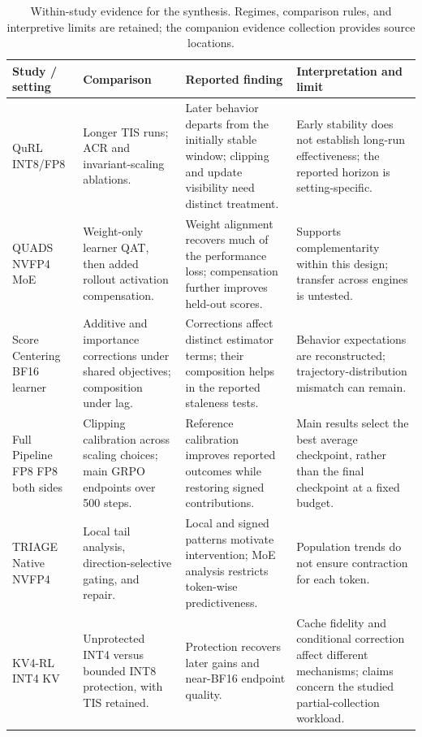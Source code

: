 \begin{table}[!htb]
\centering\small\setlength{\tabcolsep}{4pt}\renewcommand{\arraystretch}{1.12}
\caption{Within-study evidence for the synthesis. Regimes, comparison rules, and interpretive limits are retained; the companion evidence collection provides source locations.}\label{tab:observations}
\begin{tabularx}{\linewidth}{@{}P{27mm}YYY@{}}\toprule
{} \textbf{Study / setting} & \textbf{Comparison} & \textbf{Reported finding} & \textbf{Interpretation and limit}\\\midrule
{} QuRL \citep{qurl}\newline INT8/FP8 & Longer TIS runs; ACR and invariant-scaling ablations. & Later behavior departs from the initially stable window; clipping and update visibility need distinct treatment. & Early stability does not establish long-run effectiveness; the reported horizon is setting-specific.\\[6pt]
QUADS \citep{quads}\newline NVFP4 MoE & Weight-only learner QAT, then added rollout activation compensation. & Weight alignment recovers much of the performance loss; compensation further improves held-out scores. & Supports complementarity within this design; transfer across engines is untested.\\[6pt]
 Score Centering \citep{score}\newline BF16 learner & Additive and importance corrections under shared objectives; composition under lag. & Corrections affect distinct estimator terms; their composition helps in the reported staleness tests. & Behavior expectations are reconstructed; trajectory-distribution mismatch can remain.\\[6pt]
Full Pipeline FP8 \citep{fullfp8}\newline FP8 both sides & Clipping calibration across scaling choices; main GRPO endpoints over 500 steps. & Reference calibration improves reported outcomes while restoring signed contributions. & Main results select the best average checkpoint, rather than the final checkpoint at a fixed budget.\\[6pt]
 TRIAGE \citep{triage}\newline Native NVFP4 & Local tail analysis, direction-selective gating, and repair. & Local and signed patterns motivate intervention; MoE analysis restricts token-wise predictiveness. & Population trends do not ensure contraction for each token.\\[6pt]
KV4-RL \citep{kv4}\newline INT4 KV & Unprotected INT4 versus bounded INT8 protection, with TIS retained. & Protection recovers later gains and near-BF16 endpoint quality. & Cache fidelity and conditional correction affect different mechanisms; claims concern the studied partial-collection workload.\\\bottomrule
\end{tabularx}
\end{table}


